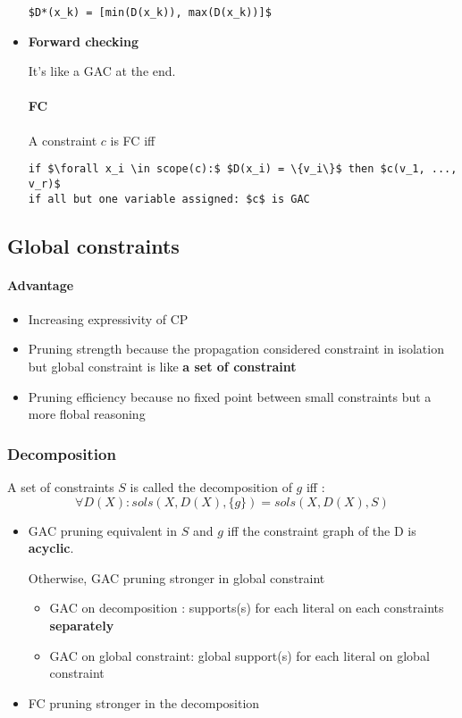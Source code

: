 \begin{itemize}
\begin{lstlisting}[mathescape]
$D*(x_k) = [min(D(x_k)), max(D(x_k))]$
        \end{lstlisting}


    \item \textbf{Forward checking}

        It's like a GAC at the end.

        \paragraph{FC} A constraint $c$ is FC iff
        \begin{lstlisting}[mathescape]
if $\forall x_i \in scope(c):$ $D(x_i) = \{v_i\}$ then $c(v_1, ..., v_r)$
if all but one variable assigned: $c$ is GAC
        \end{lstlisting}
\end{itemize}



\subsection{Global constraints}

\paragraph{Advantage}
\begin{itemize}
    \item Increasing expressivity of CP
    \item Pruning strength because the propagation considered constraint in isolation
        but global constraint is like \textbf{a set of constraint}
    \item Pruning efficiency because no fixed point between small constraints
        but a more flobal reasoning
\end{itemize}

\subsubsection{Decomposition}
A set of constraints $S$ is called the decomposition of $g$ iff :
$$ \forall D(X): sols(X, D(X), \{g\}) = sols(X, D(X), S)$$

\begin{itemize}
    \item GAC pruning equivalent in $S$ and $g$ iff the constraint
        graph of the D is \textbf{acyclic}.

        Otherwise, GAC pruning stronger in global constraint

        \begin{itemize}
            \item GAC on decomposition : supports(s) for each literal on each constraints
                \textbf{separately}
            \item GAC on global constraint: global support(s) for each literal on global constraint
        \end{itemize}


    \item FC pruning stronger in the decomposition
\end{itemize}


